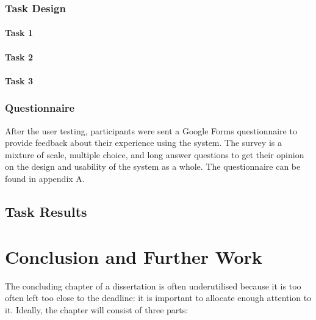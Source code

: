 \documentclass[oneside,%
                    author={Malak Hajji},
                    degree={BSc},
                    title={Designing An Accessible Computational Toolkit For Students},
                  subtitle={With Mixed Visual Abilities}]{dissertation}
\begin{document}
\subsection{Task Design}
\subsubsection{Task 1}

\subsubsection{Task 2}
\subsubsection{Task 3}

\subsection{Questionnaire}
After the user testing, participants were sent a Google Forms questionnaire to provide feedback about their experience using the system. The survey is a mixture of scale, multiple choice, and long answer questions to get their opinion on the design and usability of the system as a whole. The questionnaire can be found in appendix A.

\section{Task Results}



\chapter{Conclusion and Further Work}
\label{chap:conclusion}

\noindent
The concluding chapter of a dissertation is often underutilised because it 
is too often left too close to the deadline: it is important to allocate
enough attention to it.  Ideally, the chapter will consist of three parts:
\end{document}
